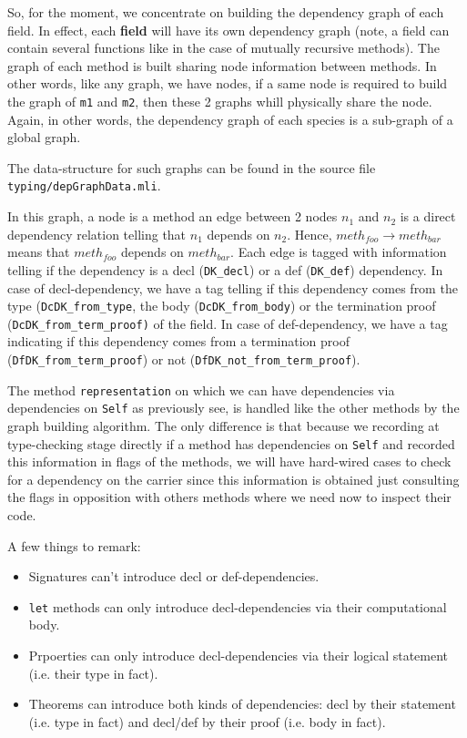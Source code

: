 \medskip
So, for the moment, we concentrate on building the dependency
graph of each field. In effect, each {\bf field} will have its own
dependency graph (note, a field can contain several functions like in
the case of mutually recursive methods). The graph of each method is
built sharing node information between methods. In other words, like
any graph, we have nodes, if a same node is required to build the
graph of {\tt m1} and {\tt m2}, then these 2 graphs whill physically
share the node. Again, in other words, the dependency graph of each
species is a sub-graph of a global graph.

The data-structure for such graphs can be found in the source file
{\tt typing/depGraphData.mli}.

In this graph, a node is a method an edge between 2 nodes $n_1$ and
$n_2$ is a direct dependency relation telling that $n_1$ depends on
$n_2$. Hence, $meth_{foo} \rightarrow meth_{bar}$ means that $meth_{foo}$
depends on $meth_{bar}$. Each edge is tagged with information telling
if the dependency is a decl ({\tt DK\_decl}) or a def
({\tt DK\_def}) dependency. In case of decl-dependency, we have a tag
telling if this dependency comes from the type
({\tt DcDK\_from\_type}, the body ({\tt DcDK\_from\_body}) or the
termination proof ({\tt DcDK\_from\_term\_proof)} of the field. In
case of def-dependency, we have a tag indicating if this dependency
comes from a termination proof ({\tt DfDK\_from\_term\_proof}) or not
({\tt DfDK\_not\_from\_term\_proof}).

\medskip
The method {\tt representation} on which we can have dependencies via
dependencies on {\tt Self} as previously see, is handled like the
other methods by the graph building algorithm. The only difference is
that because we recording at type-checking stage directly if a method
has dependencies on {\tt Self} and recorded this information in flags
of the methods, we will have hard-wired cases to check for a
dependency on the carrier since this information is obtained just
consulting the flags in opposition with others methods where we need
now to inspect their code.

\medskip
A few things to remark:
\begin{itemize}
\item Signatures can't introduce decl or def-dependencies.
\item {\tt let} methods can only introduce decl-dependencies via their
  computational body.
\item Prpoerties can only introduce decl-dependencies via their
  logical statement (i.e. their type in fact).
\item Theorems can introduce both kinds of dependencies: decl by their
  statement (i.e. type in fact) and decl/def by their proof (i.e. body
  in fact).
\end{itemize}


